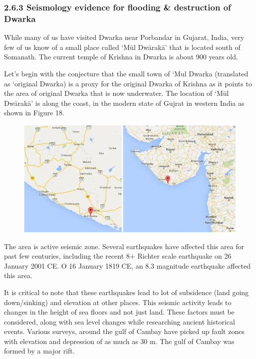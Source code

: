 \subsubsection*{2.6.3 Seismology evidence for flooding \& destruction of Dwarka}

While many of us have visited Dwarka near Porbandar in Gujarat, India, very few of us know of a small place called ‘Mūl Dwārakā’ that is located south of Somanath. The current temple of Krishna in Dwarka is about 900 years old.

Let’s begin with the conjecture that the small town of ‘Mul Dwarka (translated as ‘original Dwarka) is a proxy for the original Dwarka of Krishna as it points to the area of original Dwarka that is now underwater. The location of ‘Mūl Dwārakā’ is along the coast, in the modern state of Gujrat in western India as shown in Figure 18.

\begin{figure}[!htbp]
\includegraphics[scale=0.4]{"images/8-18.jpg"}
\caption{}\label{art8-fig18}
\end{figure}

The area is active seismic zone. Several earthquakes have affected this area for past few centuries, including the recent 8+ Richter scale earthquake on 26 January 2001 CE. O 16 January 1819 CE, an 8.3 magnitude earthquake affected this area.

It is critical to note that these earthquakes lead to lot of subsidence (land going down/sinking) and elevation at other places. This seismic activity leads to changes in the height of sea floors and not just land. These factors must be considered, along with sea level changes while researching ancient historical events. Various surveys, around the gulf of Cambay have picked up fault zones with elevation and depression of as much as 30 m. The gulf of Cambay was formed by a major rift.

